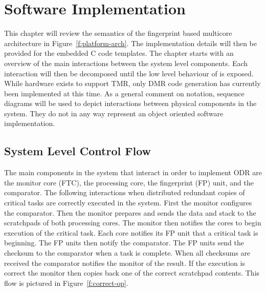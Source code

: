 
\chapter{Software Implementation} %

\label{c:soft-impl} %

	This chapter will review the semantics of the fingerprint based multicore architecture in Figure~\ref{f:platform-arch}. 
	The implementation details will then be provided for the embedded C code templates. 
	The chapter starts with an overview of the main interactions between the system level components. 
	Each interaction will then be decomposed until the low level behaviour of is exposed. While hardware exists to support TMR, only DMR code generation has currently been implemented at this time. 
	As a general comment on notation, sequence diagrams will be used to depict interactions between physical components in the system. They do not in any way represent an object oriented software implementation. 


\section{System Level Control Flow}

	The main components in the system that interact in order to implement ODR are the monitor core (FTC), the processing core, the fingerprint (FP) unit, and the comparator. 
	The following interactions when distributed redundant copies of critical tasks are correctly executed in the system. 
	First the monitor configures the comparator. 
	Then the monitor prepares and sends the data and stack to the scratchpads of both processing cores. 
	The monitor then notifies the cores to begin execution of the critical task. 
	Each core notifies its FP unit that a critical task is beginning. 
	The FP units then notify the comparator. 
	The FP units send the checksum to the comparator when a task is complete. 
	When all checksums are received the comparator notifies the monitor of the result. 
	If the execution is correct the monitor then copies back one of the correct scratchpad contents. 
	This flow is pictured in Figure~\ref{f:correct-op}.

